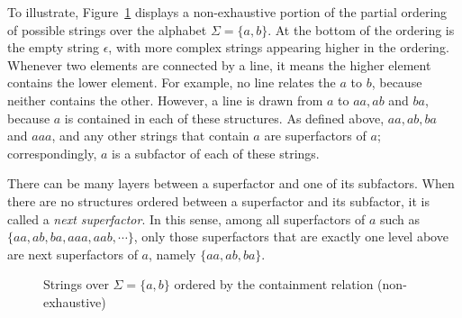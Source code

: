 \documentclass{CUP-JNL-PHO}%
\theoremstyle{definition}
\numberwithin{equation}{section}
\theoremstyle{definition}
\begin{document}
To illustrate, Figure~\ref{fig.hasse.str} displays a
non-exhaustive portion of the partial ordering of possible strings
over the alphabet $\Sigma = \{a,b\}$. At the bottom of the ordering is
the empty string $\epsilon$, with more complex strings appearing
higher in the ordering.  Whenever two elements are connected by a
line, it means the higher element contains the lower element. For
example, no line relates the \(a\) to \(b\), because neither contains
the other.  However, a line is drawn from \(a\) to \(aa, ab\) and
\(ba\), because \(a\) is contained in each of these structures. As
defined above, \(aa, ab, ba\) and \(aaa\), and any other strings that
contain \(a\) are superfactors of \(a\); correspondingly, \(a\) is a
subfactor of each of these strings.

There can be many layers between a superfactor and one of its 
subfactors. When there are no structures ordered between a 
superfactor and its subfactor, it is called a \textit{next superfactor}. 
In this sense, among all superfactors of \(a\) such as 
\(\{aa, ab, ba, aaa, aab, \cdots\}\), only those superfactors that 
are exactly one level above are next superfactors of \(a\), 
namely \(\{aa, ab, ba\}\).

\begin{figure}
	\centering
	\caption{Strings over $\Sigma = \{a,b\}$ ordered by the containment relation (non-exhaustive)}
	\label{fig.hasse.str}
\end{figure}%
\end{document}
